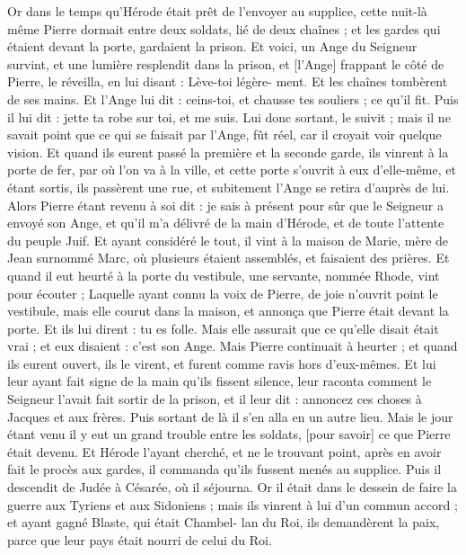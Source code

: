 \begin{multicols}{2}
Or dans le temps qu'Hérode était prêt de l'envoyer au supplice, cette nuit-là même Pierre dormait entre deux soldats, lié de deux chaînes ; et les gardes qui étaient devant la porte, gardaient la prison.
Et voici, un Ange du Seigneur survint, et une lumière resplendit dans la prison, et [l'Ange] frappant le côté de Pierre, le réveilla, en lui disant : Lève-toi légère- ment. Et les chaînes tombèrent de ses mains.
Et l'Ange lui dit : ceins-toi, et chausse tes souliers ; ce qu'il fit. Puis il lui dit : jette ta robe sur toi, et me suis.
Lui donc sortant, le suivit ; mais il ne savait point que ce qui se faisait par l'Ange, fût réel, car il croyait voir quelque vision.
Et quand ils eurent passé la première et la seconde garde, ils vinrent à la porte de fer, par où l'on va à la ville, et cette porte s'ouvrit à eux d'elle-même, et étant sortis, ils passèrent une rue, et subitement l'Ange se retira d'auprès de lui.
Alors Pierre étant revenu à soi dit : je sais à présent pour sûr que le Seigneur a envoyé son Ange, et qu'il m'a délivré de la main d'Hérode, et de toute l'attente du peuple Juif.
Et ayant considéré le tout, il vint à la maison de Marie, mère de Jean surnommé Marc, où plusieurs étaient assemblés, et faisaient des prières.
Et quand il eut heurté à la porte du vestibule, une servante, nommée Rhode, vint pour écouter ;
Laquelle ayant connu la voix de Pierre, de joie n'ouvrit point le vestibule, mais elle courut dans la maison, et annonça que Pierre était devant la porte.
Et ils lui dirent : tu es folle. Mais elle assurait que ce qu'elle disait était vrai ; et eux disaient : c'est son Ange.
Mais Pierre continuait à heurter ; et quand ils eurent ouvert, ils le virent, et furent comme ravis hors d'eux-mêmes.
Et lui leur ayant fait signe de la main qu'ils fissent silence, leur raconta comment le Seigneur l'avait fait sortir de la prison, et il leur dit : annoncez ces choses à Jacques et aux frères. Puis sortant de là il s'en alla en un autre lieu.
Mais le jour étant venu il y eut un grand trouble entre les soldats, [pour savoir] ce que Pierre était devenu.
Et Hérode l'ayant cherché, et ne le trouvant point, après en avoir fait le procès aux gardes, il commanda qu'ils fussent menés au supplice. Puis il descendit de Judée à Césarée, où il séjourna.
Or il était dans le dessein de faire la guerre aux Tyriens et aux Sidoniens ; mais ils vinrent à lui d'un commun accord ; et ayant gagné Blaste, qui était Chambel- lan du Roi, ils demandèrent la paix, parce que leur pays était nourri de celui du Roi.

\end{multicols}
